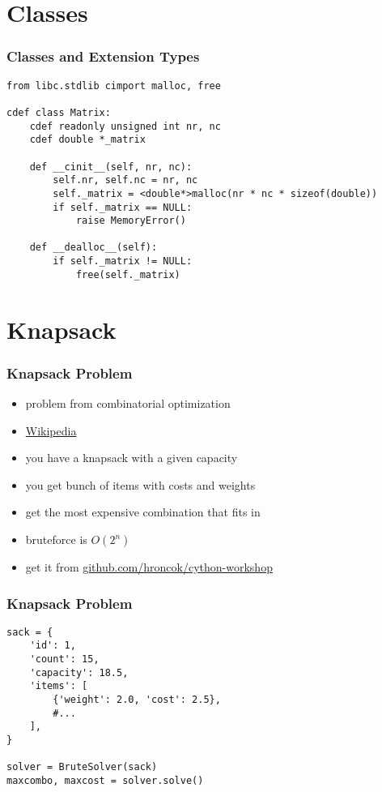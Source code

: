 \documentclass{beamer}
\begin{document}
\section{Classes}

\begin{frame}[fragile]
  \frametitle{Classes and Extension Types}
    \begin{lstlisting}
from libc.stdlib cimport malloc, free

cdef class Matrix:
    cdef readonly unsigned int nr, nc
    cdef double *_matrix

    def __cinit__(self, nr, nc):
        self.nr, self.nc = nr, nc
        self._matrix = <double*>malloc(nr * nc * sizeof(double))
        if self._matrix == NULL:
            raise MemoryError()

    def __dealloc__(self):
        if self._matrix != NULL:
            free(self._matrix)

    \end{lstlisting}
\end{frame}


\section{Knapsack}

\begin{frame}
  \frametitle{Knapsack Problem}
    \begin{itemize}
      \item problem from combinatorial optimization
      \item \href{https://en.wikipedia.org/wiki/Knapsack_problem}{Wikipedia}
      \item you have a knapsack with a given capacity
      \item you get bunch of items with costs and weights
      \item get the most expensive combination that fits in
      \item bruteforce is $O(2^n)$
      \item get it from \href{https://github.com/hroncok/cython-workshop}{github.com/hroncok/cython-workshop}
    \end{itemize}
\end{frame}

\begin{frame}[fragile]
  \frametitle{Knapsack Problem}
    \begin{lstlisting}
sack = {
    'id': 1,
    'count': 15,
    'capacity': 18.5,
    'items': [
        {'weight': 2.0, 'cost': 2.5},
        #...
    ],
}

solver = BruteSolver(sack)
maxcombo, maxcost = solver.solve()
    \end{lstlisting}
\end{frame}
\end{document}
